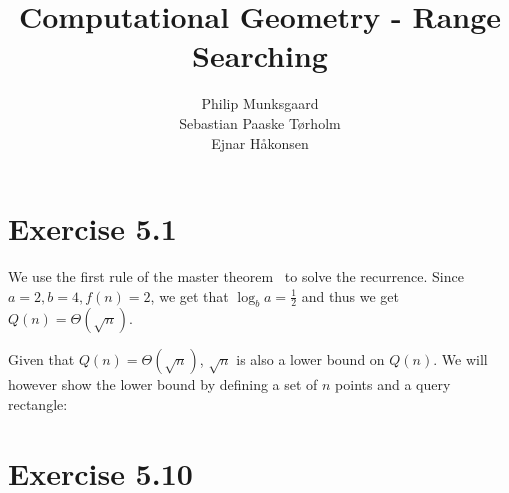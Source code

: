 \documentclass[11pt,a4paper]{article}
\title{Computational Geometry - Range Searching}
\author{Philip Munksgaard \\ Sebastian Paaske Tørholm \\ Ejnar Håkonsen}
\begin{document}
\maketitle

\section{Exercise 5.1}

We use the first rule of the master theorem~\cite{Cormen theorem 4.1}
to solve the recurrence. Since $a=2, b=4, f(n)=2$, we get that $\log_b a
= \frac{1}{2}$ and thus we get $Q(n) = \Theta(\sqrt{n})$.

Given that $Q(n) = \Theta(\sqrt{n})$, $\sqrt{n}$ is also a lower
bound on $Q(n)$. We will however show the lower bound by defining a
set of $n$ points and a query rectangle:

\section{Exercise 5.10}
\end{document}
